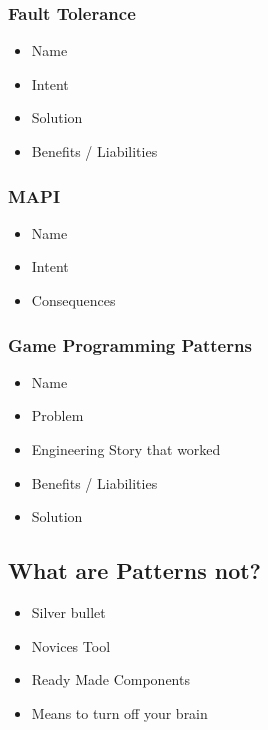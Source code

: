 \subsubsection{Fault Tolerance}
\begin{itemize}
    \item Name
    \item Intent
    \item Solution
    \item Benefits / Liabilities
\end{itemize}
\subsubsection{MAPI}
\begin{itemize}
    \item Name
    \item Intent
    \item Consequences
\end{itemize}
\subsubsection{Game Programming Patterns}
\begin{itemize}
    \item Name
    \item Problem
    \item Engineering Story that worked
    \item Benefits / Liabilities
    \item Solution
\end{itemize}

\subsection{What are Patterns not?}
\begin{itemize}
    \item Silver bullet
    \item Novices Tool
    \item Ready Made Components
    \item Means to turn off your brain
\end{itemize}
